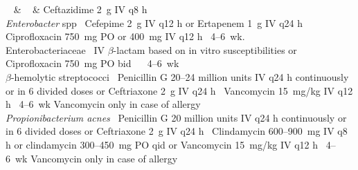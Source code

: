 {      &   & Ceftazidime 2 g IV q8 h  \\
    \emph{Enterobacter} spp 
    Cefepime 2 g IV q12 h \newline or \newline Ertapenem 1 g IV q24 h  Ciprofloxacin 750 mg PO \newline  or 400 mg IV q12 h  4–6 wk.  \\
    Enterobacteriaceae  IV $\beta$-lactam based on in vitro susceptibilities or \newline Ciprofloxacin 750 mg PO bid    4–6 wk  \\
    $\beta$-hemolytic streptococci  Penicillin G 20–24 million units IV q24 h continuously or in 6 divided doses \newline or \newline Ceftriaxone 2 g IV q24 h  Vancomycin 15 mg/kg IV q12 h  4–6 wk \newline Vancomycin only in case of allergy  \\
    \emph{Propionibacterium acnes}  Penicillin G 20 million units IV q24 h continuously or in 6 divided doses \newline or \newline Ceftriaxone 2 g IV q24 h  Clindamycin 600–900 mg IV q8 h or clindamycin 300–450 mg PO qid \newline or \newline Vancomycin 15 mg/kg IV q12 h  4–6 wk \newline \newline Vancomycin only in case of allergy  \\
}